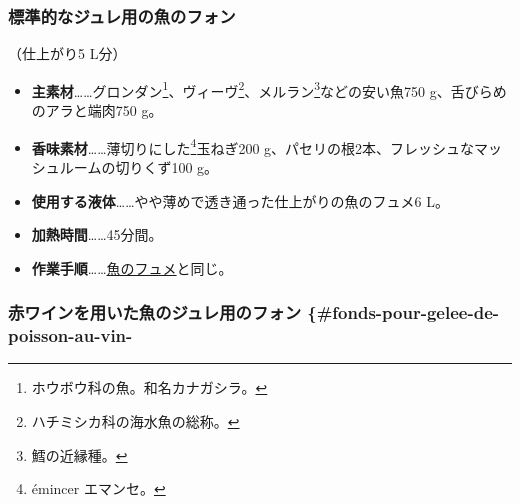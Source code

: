 \begin{recette}
\maeaki

\hypertarget{fonds-de-poisson-pour-gelee-ordinaire}{%
\subsubsection{標準的なジュレ用の魚のフォン}\label{fonds-de-poisson-pour-gelee-ordinaire}}



（仕上がり5 L分）

\begin{itemize}
\item
  \textbf{主素材}\ldots{}\ldots{}グロンダン\footnote{ホウボウ科の魚。和名カナガシラ。}、ヴィーヴ\footnote{ハチミシカ科の海水魚の総称。}、メルラン\footnote{鱈の近縁種。}などの安い魚750
  g、舌びらめのアラと端肉750 g。
\item
  \textbf{香味素材}\ldots{}\ldots{}薄切りにした\footnote{émincer
    エマンセ。}玉ねぎ200
  g、パセリの根2本、フレッシュなマッシュルームの切りくず100 g。
\item
  \textbf{使用する液体}\ldots{}\ldots{}やや薄めで透き通った仕上がりの魚のフュメ6
  L。
\item
  \textbf{加熱時間}\ldots{}\ldots{}45分間。
\item
  \textbf{作業手順}\ldots{}\ldots{}\protect\hyperlink{fumet-de-poisson}{魚のフュメ}と同じ。
\end{itemize}

\maeaki

\hypertarget{ux8d64ux30efux30a4ux30f3ux3092ux7528ux3044ux305fux9b5aux306eux30b8ux30e5ux30ecux7528ux306eux30d5ux30a9ux30f3-fonds-pour-gelee-de-poisson-au-vin-}{%
\subsubsection{赤ワインを用いた魚のジュレ用のフォン
\{\#fonds-pour-gelee-de-poisson-au-vin-}\label{ux8d64ux30efux30a4ux30f3ux3092ux7528ux3044ux305fux9b5aux306eux30b8ux30e5ux30ecux7528ux306eux30d5ux30a9ux30f3-fonds-pour-gelee-de-poisson-au-vin-}}



\end{recette}
